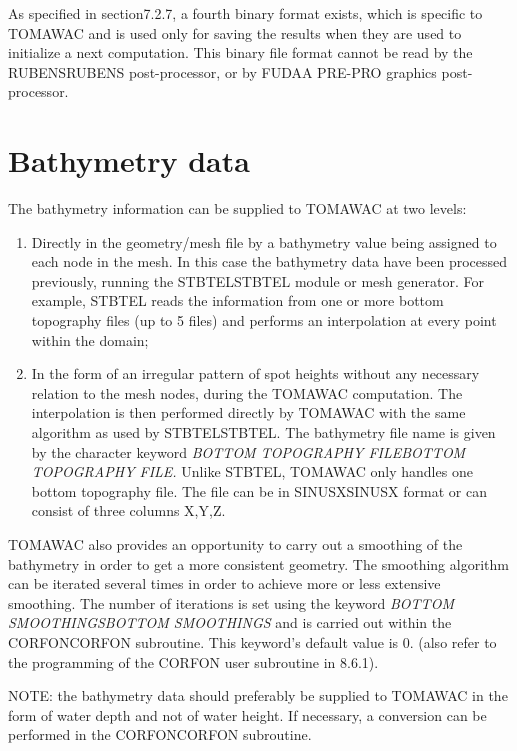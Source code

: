  As specified in section7.2.7, a fourth binary format exists, which is specific to TOMAWAC and is used only for saving the results when they are used to initialize a next computation. This binary file format cannot be read by the RUBENSRUBENS post-processor, or by FUDAA PRE-PRO graphics post-processor.


\section{ Bathymetry data }

 The bathymetry information can be supplied to TOMAWAC at two levels:

\begin{enumerate}
\item  Directly in the geometry/mesh file by a bathymetry value being assigned to each node in the mesh. In this case the bathymetry data have been processed previously, running the STBTELSTBTEL module or mesh generator. For example, STBTEL reads the information from one or more bottom topography files (up to 5 files) and performs an interpolation at every point within the domain;

\item  In the form of an irregular pattern of spot heights without any necessary relation to the mesh nodes, during the TOMAWAC computation. The interpolation is then performed directly by TOMAWAC with the same algorithm as used by STBTELSTBTEL. The bathymetry file name is given by the character keyword \textit{BOTTOM TOPOGRAPHY FILEBOTTOM TOPOGRAPHY FILE. }Unlike STBTEL, TOMAWAC only handles one bottom topography file. The file can be in SINUSXSINUSX format or can consist of three columns X,Y,Z.
\end{enumerate}

 TOMAWAC also provides an opportunity to carry out a smoothing of the bathymetry in order to get a more consistent geometry. The smoothing algorithm can be iterated several times in order to achieve more or less extensive smoothing. The number of iterations is set using the keyword \textit{BOTTOM SMOOTHINGSBOTTOM SMOOTHINGS} and is carried out within the CORFONCORFON subroutine. This keyword's default value is 0. (also refer to the programming of the CORFON user subroutine in 8.6.1).

 NOTE: the bathymetry data should preferably be supplied to TOMAWAC in the form of water depth and not of water height. If necessary, a conversion can be performed in the CORFONCORFON subroutine.


